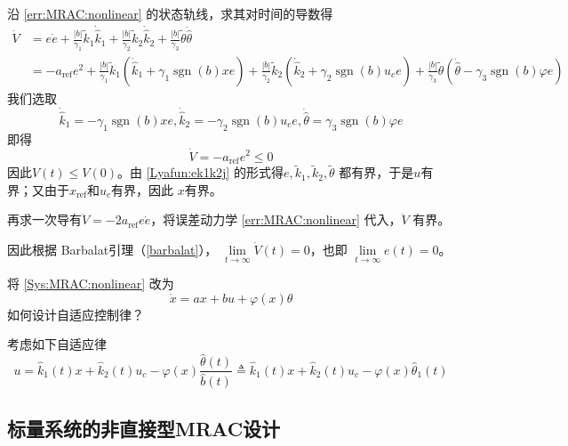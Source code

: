 沿 \eqref{err:MRAC:nonlinear} 的状态轨线，求其对时间的导数得
\begin{align*}
  \dot{V} & =  e  \dot{e} + \frac{| b |}{\gamma_1} \widetilde{ k} _1
  \dot{\hat{k}} _1 + \frac{| b |}{\gamma_2} \tilde{k} _2 \dot{\hat{k}} _2 +
  \frac{| b |}{\gamma_3} \tilde{\theta}  \dot{\hat{\theta}}\\
  & =  - a_{\ensuremath{\operatorname{ref}}} e^2 + \frac{| b |}{\gamma_1}
  \widetilde{ k} _1 (\dot{\hat{k}}_1 + \gamma_1
  \ensuremath{\operatorname{sgn}} (b) x  e) + \frac{| b |}{\gamma_2} \tilde{k}
  _2 (\dot{\hat{k}}_2 + \gamma_2 \ensuremath{\operatorname{sgn}} (b)  u_c e) +
  \frac{| b |}{\gamma_3} \tilde{\theta} (\dot{\hat{\theta}} - \gamma_3
  \ensuremath{\operatorname{sgn}} (b)   \varphi e)
\end{align*}
我们选取
\begin{equation*}
  \dot{\hat{k}}_1 = -  \gamma_1 \ensuremath{\operatorname{sgn}} (b) x  e,
  \dot{\hat{k}}_2 = -  \gamma_2 \ensuremath{\operatorname{sgn}} (b)  u_c e,
  \dot{\hat{\theta}} = \gamma_3 \ensuremath{\operatorname{sgn}} (b)   \varphi e
\end{equation*}
即得
\begin{equation*}
  \dot{V} = - a_{\ensuremath{\operatorname{ref}}} e^2 \leq 0
\end{equation*}
因此$V (t) \leq V (0)$。由 \eqref{Lyafun:ek1k2j} 的形式得$e, \tilde{k} _1,
\tilde{k} _2, \tilde{\theta}$ 都有界，于是$u$有界；又由于$x_\mathrm{ref}$和$u_c$有界，因此 $x$有界。

再求一次导有$ \ddot{V} = - 2 a_{\ensuremath{\operatorname{ref}}} e  \dot{e} $，将误差动力学 \eqref{err:MRAC:nonlinear} 代入，$\ddot{V}$ 有界。

因此根据 Barbalat引理（\ref{barbalat}）， $\lim\limits_{t \rightarrow \infty}
\dot{V} (t) = 0$，也即 $\lim\limits_{t \rightarrow \infty} e (t) = 0$。

\begin{problem}
将 \eqref{Sys:MRAC:nonlinear} 改为
  \[ \dot{x} = a  x + b  u + \varphi(x) \theta \]
如何设计自适应控制律？
\end{problem}
\begin{hint}
考虑如下自适应律
\[ u = \hat{k}_1 (t) x + \hat{k}_2 (t) u_c - \varphi (x)
       \frac{\hat{\theta} (t)}{\hat{b} (t)} \triangleq \hat{k}_1 (t) x +
       \hat{k}_2 (t) u_c - \varphi (x) \hat{\theta}_1 (t) \]
\end{hint}


\subsection{标量系统的非直接型MRAC设计}

